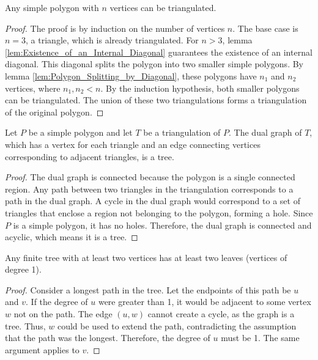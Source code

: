 \begin{lemma}
    \label{lem:Existence_of_Triangulation}
    Any simple polygon with $n$ vertices can be triangulated.
\end{lemma}

\begin{proof}
    The proof is by induction on the number of vertices $n$. The base case is $n=3$, a triangle, which is already triangulated.
    For $n > 3$, lemma \ref{lem:Existence_of_an_Internal_Diagonal} guarantees the existence of an internal diagonal. This diagonal splits the polygon into two smaller simple polygons. By lemma \ref{lem:Polygon_Splitting_by_Diagonal}, these polygons have $n_1$ and $n_2$ vertices, where $n_1, n_2 < n$. By the induction hypothesis, both smaller polygons can be triangulated. The union of these two triangulations forms a triangulation of the original polygon.
\end{proof}

\begin{lemma}
    \label{lem:Dual_Graph_is_a_Tree}
    Let $P$ be a simple polygon and let $T$ be a triangulation of $P$. The dual graph of $T$, which has a vertex for each triangle and an edge connecting vertices corresponding to adjacent triangles, is a tree.
\end{lemma}

\begin{proof}
    The dual graph is connected because the polygon is a single connected region. Any path between two triangles in the triangulation corresponds to a path in the dual graph. A cycle in the dual graph would correspond to a set of triangles that enclose a region not belonging to the polygon, forming a hole. Since $P$ is a simple polygon, it has no holes. Therefore, the dual graph is connected and acyclic, which means it is a tree.
\end{proof}

\begin{lemma}
    \label{lem:Existence_of_Leaves_in_a_Tree}
    Any finite tree with at least two vertices has at least two leaves (vertices of degree 1).
\end{lemma}

\begin{proof}
    Consider a longest path in the tree. Let the endpoints of this path be $u$ and $v$. If the degree of $u$ were greater than 1, it would be adjacent to some vertex $w$ not on the path. The edge $(u,w)$ cannot create a cycle, as the graph is a tree. Thus, $w$ could be used to extend the path, contradicting the assumption that the path was the longest. Therefore, the degree of $u$ must be 1. The same argument applies to $v$.
\end{proof}

